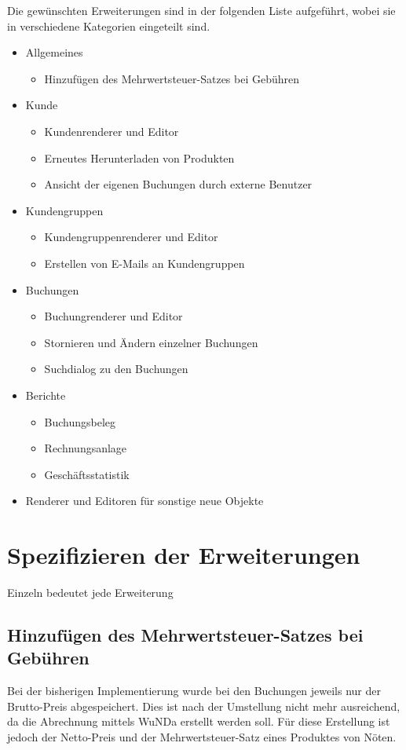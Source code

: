 Die gewünschten Erweiterungen sind in der folgenden Liste aufgeführt, wobei sie in verschiedene Kategorien eingeteilt sind. 
\begin{itemize}
	\item Allgemeines
	\begin{itemize}
		\item Hinzufügen des Mehrwertsteuer-Satzes bei Gebühren
	\end{itemize}
	\item Kunde
	\begin{itemize}
		\item Kundenrenderer und Editor
		\item Erneutes Herunterladen von Produkten
		\item Ansicht der eigenen Buchungen durch externe Benutzer
	\end{itemize}
	\item Kundengruppen
	\begin{itemize}
		\item Kundengruppenrenderer und Editor
		\item Erstellen von E-Mails an Kundengruppen
	\end{itemize}
	\item Buchungen
	\begin{itemize}
		\item Buchungrenderer und Editor
		\item Stornieren und Ändern einzelner Buchungen
		\item Suchdialog zu den Buchungen
	\end{itemize}
	\item Berichte
	\begin{itemize}
		\item Buchungsbeleg
		\item Rechnungsanlage
		\item Geschäftsstatistik
	\end{itemize}	 
	\item Renderer und Editoren für sonstige neue Objekte
\end{itemize}

\section{Spezifizieren der Erweiterungen}
Einzeln bedeutet jede Erweiterung
\subsection{Hinzufügen des Mehrwertsteuer-Satzes bei Gebühren}
Bei der bisherigen Implementierung wurde bei den Buchungen jeweils nur der Brutto-Preis abgespeichert. Dies ist nach der Umstellung nicht mehr ausreichend, da die Abrechnung mittels \ac{WuNDa} erstellt werden soll. Für diese Erstellung ist jedoch der Netto-Preis und der Mehrwertsteuer-Satz eines Produktes von Nöten.

